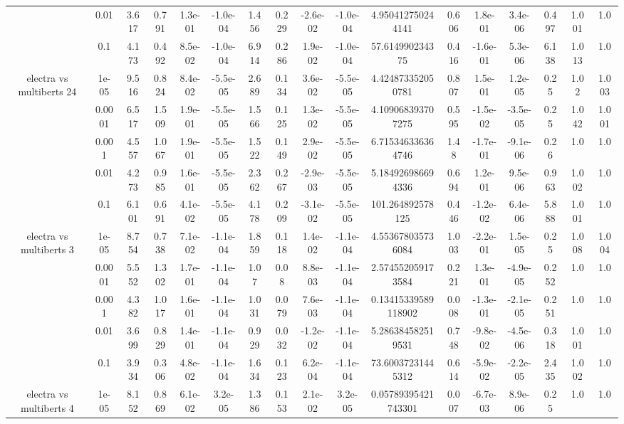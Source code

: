 \begin{tabular}{|c|c|c|c|c|c|c|c|c|c|c|c|c|c|c|c|c|}
 & 0.01 & 3.617 & 0.791 & 1.3e-01 & -1.0e-04 & 1.456 & 0.229 & -2.6e-02 & -1.0e-04 & 4.950412750244141 & 0.606 & 1.8e-01 & 3.4e-06 & 0.497 & 1.001 & 1.0 \\
 & 0.1 & 4.173 & 0.492 & 8.5e-02 & -1.0e-04 & 6.914 & 0.286 & 1.9e-02 & -1.0e-04 & 57.614990234375 & 0.416 & -1.6e-01 & 5.3e-06 & 6.138 & 1.013 & 1.0 \\
\hline
\multirow{5}{*}{electra  vs multiberts 24} & 1e-05 & 9.516 & 0.824 & 8.4e-02 & -5.5e-05 & 2.689 & 0.134 & 3.6e-02 & -5.5e-05 & 4.424873352050781 & 0.807 & 1.5e-01 & 1.2e-05 & 0.25 & 1.02 & 1.003 \\
 & 0.0001 & 6.517 & 1.509 & 1.9e-01 & -5.5e-05 & 1.566 & 0.125 & 1.3e-02 & -5.5e-05 & 4.109068393707275 & 0.595 & -1.5e-02 & -3.5e-05 & 0.25 & 1.042 & 1.001 \\
 & 0.001 & 4.557 & 1.067 & 1.9e-01 & -5.5e-05 & 1.522 & 0.149 & 2.9e-02 & -5.5e-05 & 6.715346336364746 & 1.48 & -1.7e-01 & -9.1e-06 & 0.26 & 1.0 & 1.0 \\
 & 0.01 & 4.273 & 0.985 & 1.6e-01 & -5.5e-05 & 2.362 & 0.267 & -2.9e-03 & -5.5e-05 & 5.184926986694336 & 0.694 & 1.2e-01 & 9.5e-06 & 0.963 & 1.002 & 1.0 \\
 & 0.1 & 6.101 & 0.691 & 4.1e-02 & -5.5e-05 & 4.178 & 0.209 & -3.1e-02 & -5.5e-05 & 101.264892578125 & 0.446 & -1.2e-02 & 6.4e-06 & 5.888 & 1.001 & 1.0 \\
\hline
\multirow{5}{*}{electra  vs multiberts 3} & 1e-05 & 8.754 & 0.738 & 7.1e-02 & -1.1e-04 & 1.859 & 0.118 & 1.4e-02 & -1.1e-04 & 4.553678035736084 & 1.003 & -2.2e-01 & 1.5e-05 & 0.25 & 1.008 & 1.004 \\
 & 0.0001 & 5.552 & 1.302 & 1.7e-01 & -1.1e-04 & 1.07 & 0.08 & 8.8e-03 & -1.1e-04 & 2.574552059173584 & 0.221 & 1.3e-01 & -4.9e-05 & 0.252 & 1.0 & 1.0 \\
 & 0.001 & 4.382 & 1.017 & 1.6e-01 & -1.1e-04 & 1.031 & 0.079 & 7.6e-03 & -1.1e-04 & 0.13415339589118902 & 0.008 & -1.3e-01 & -2.1e-05 & 0.251 & 1.0 & 1.0 \\
 & 0.01 & 3.699 & 0.829 & 1.4e-01 & -1.1e-04 & 0.929 & 0.032 & -1.2e-02 & -1.1e-04 & 5.286384582519531 & 0.748 & -9.8e-02 & -4.5e-06 & 0.318 & 1.001 & 1.0 \\
 & 0.1 & 3.934 & 0.306 & 4.8e-02 & -1.1e-04 & 1.634 & 0.123 & 6.2e-04 & -1.1e-04 & 73.60037231445312 & 0.614 & -5.9e-02 & -2.2e-05 & 2.435 & 1.002 & 1.0 \\
\hline
\multirow{5}{*}{electra  vs multiberts 4} & 1e-05 & 8.152 & 0.869 & 6.1e-02 & 3.2e-05 & 1.386 & 0.153 & 2.1e-02 & 3.2e-05 & 0.05789395421743301 & 0.007 & -6.7e-03 & 8.9e-06 & 0.25 & 1.0 & 1.0 \\

\end{tabular}
